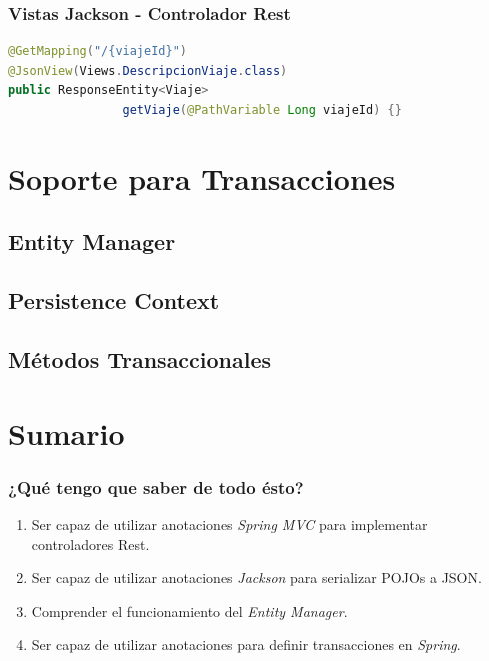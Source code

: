 \documentclass[a4paper,slidestop,xcolor=pst,blue]{beamer}
\begin{document}
\begin{frame}[c,fragile]
    \frametitle{Vistas Jackson - Controlador Rest}
\begin{lstlisting}[basicstyle=\small,language=Java]
@GetMapping("/{viajeId}")
@JsonView(Views.DescripcionViaje.class)
public ResponseEntity<Viaje>
                getViaje(@PathVariable Long viajeId) {}
\end{lstlisting}
\end{frame}

\section{Soporte para Transacciones}

\subsection{Entity Manager}


\subsection{Persistence Context}


\subsection{Métodos Transaccionales}


\section{Sumario}

\begin{frame}[c]
    \frametitle{¿Qué tengo que saber de todo ésto?}
    \begin{enumerate}[<+->]
        \item Ser capaz de utilizar anotaciones \emph{Spring MVC} para implementar controladores Rest.
        \item Ser capaz de utilizar anotaciones \emph{Jackson} para serializar POJOs a JSON.
        \item Comprender el funcionamiento del \emph{Entity Manager}.
        \item Ser capaz de utilizar anotaciones para definir transacciones en \emph{Spring}.
    \end{enumerate}
\end{frame}
\end{document}
